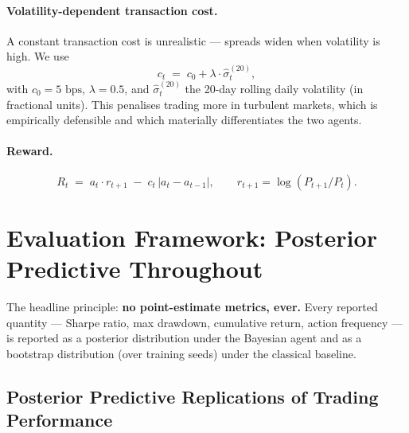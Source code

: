 \documentclass[11pt]{article}
\begin{document}
\paragraph{Volatility-dependent transaction cost.} A constant transaction cost is unrealistic --- spreads widen when volatility is high. We use
\begin{equation}
\label{eq:cost}
c_t \;=\; c_0 + \lambda \cdot \hat\sigma_t^{(20)},
\end{equation}
with $c_0 = 5\text{ bps}$, $\lambda = 0.5$, and $\hat\sigma_t^{(20)}$ the 20-day rolling daily volatility (in fractional units). This penalises trading more in turbulent markets, which is empirically defensible and which materially differentiates the two agents.

\paragraph{Reward.}
\begin{equation}
R_t \;=\; a_t \cdot r_{t+1} \;-\; c_t \,\big|a_t - a_{t-1}\big|, \qquad r_{t+1} = \log(P_{t+1}/P_t).
\end{equation}

\newpage

\section{Evaluation Framework: Posterior Predictive Throughout}
\label{sec:eval}

The headline principle: \textbf{no point-estimate metrics, ever.} Every reported quantity --- Sharpe ratio, max drawdown, cumulative return, action frequency --- is reported as a posterior distribution under the Bayesian agent and as a bootstrap distribution (over training seeds) under the classical baseline.

\subsection{Posterior Predictive Replications of Trading Performance}
\end{document}
